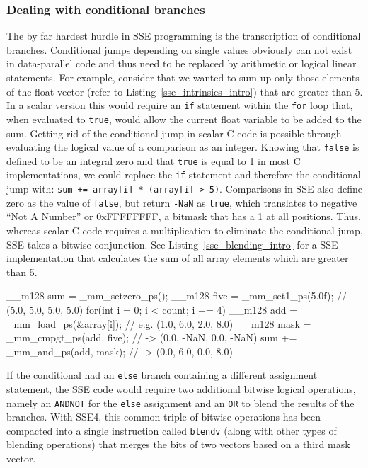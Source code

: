 \subsubsection{Dealing with conditional branches}
\label{conditional_branches} 
The by far hardest hurdle in SSE programming is the transcription of conditional branches. Conditional jumps depending on single values obviously can not exist in data-parallel code and thus need to be replaced by arithmetic or logical linear statements. For example, consider that we wanted to sum up only those elements of the float vector (refer to Listing~\ref{sse_intrinsics_intro}) that are greater than 5. In a scalar version this would require an \texttt{if} statement within the \texttt{for} loop that, when evaluated to \texttt{true}, would allow the current float variable to be added to the sum. Getting rid of the conditional jump in scalar C code is possible through evaluating the logical value of a comparison as an integer. Knowing that \texttt{false} is defined to be an integral zero and that \texttt{true} is equal to 1 in most C implementations, we could replace the \texttt{if} statement and therefore the conditional jump with: \texttt{sum += array[i] * (array[i] > 5)}. Comparisons in SSE also define zero as the value of \texttt{false}, but return \texttt{-NaN} as \texttt{true}, which translates to negative ``Not A Number'' or 0xFFFFFFFF, a bitmask that has a 1 at all positions. Thus, whereas scalar C code requires a multiplication to eliminate the conditional jump, SSE takes a bitwise conjunction. See Listing~\ref{sse_blending_intro} for a SSE implementation that calculates the sum of all array elements which are greater than 5.

\begin{code}[caption={Sum of array elements greater than 5}, label=sse_blending_intro]
  __m128 sum = _mm_setzero_ps();
  __m128 five = _mm_set1_ps(5.0f); // (5.0, 5.0, 5.0, 5.0)
  for(int i = 0; i < count; i += 4) {
    __m128 add = _mm_load_ps(&array[i]); // e.g. (1.0, 6.0, 2.0, 8.0)
    __m128 mask = _mm_cmpgt_ps(add, five); // -> (0.0, -NaN, 0.0, -NaN)
    sum += _mm_and_ps(add, mask); // -> (0.0, 6.0, 0.0, 8.0)
  }
\end{code}

If the conditional had an \texttt{else} branch containing a different assignment statement, the SSE code would require two additional bitwise logical operations, namely an \texttt{ANDNOT} for the \texttt{else} assignment and an \texttt{OR} to blend the results of the branches. With SSE4, this common triple of bitwise operations has been compacted into a single instruction called \texttt{blendv} (along with other types of blending operations) that merges the bits of two vectors based on a third mask vector. 


